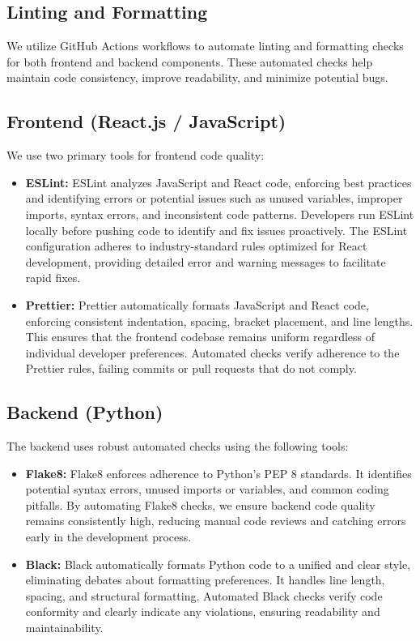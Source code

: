 \documentclass[12pt, titlepage]{article}
\begin{document}
\subsection{Linting and Formatting}

We utilize GitHub Actions workflows to automate linting and formatting checks for both frontend and backend components. These automated checks help maintain code consistency, improve readability, and minimize potential bugs.

\subsection{Frontend (React.js / JavaScript)}

We use two primary tools for frontend code quality:
\begin{itemize}
\item \textbf{ESLint:} ESLint analyzes JavaScript and React code, enforcing best practices and identifying errors or potential issues such as unused variables, improper imports, syntax errors, and inconsistent code patterns. Developers run ESLint locally before pushing code to identify and fix issues proactively. The ESLint configuration adheres to industry-standard rules optimized for React development, providing detailed error and warning messages to facilitate rapid fixes.
\item \textbf{Prettier:} Prettier automatically formats JavaScript and React code, enforcing consistent indentation, spacing, bracket placement, and line lengths. This ensures that the frontend codebase remains uniform regardless of individual developer preferences. Automated checks verify adherence to the Prettier rules, failing commits or pull requests that do not comply.
\end{itemize}

\subsection{Backend (Python)}

The backend uses robust automated checks using the following tools:
\begin{itemize}
\item \textbf{Flake8:} Flake8 enforces adherence to Python’s PEP 8 standards. It identifies potential syntax errors, unused imports or variables, and common coding pitfalls. By automating Flake8 checks, we ensure backend code quality remains consistently high, reducing manual code reviews and catching errors early in the development process.
\item \textbf{Black:} Black automatically formats Python code to a unified and clear style, eliminating debates about formatting preferences. It handles line length, spacing, and structural formatting. Automated Black checks verify code conformity and clearly indicate any violations, ensuring readability and maintainability.
\end{itemize}
\end{document}
